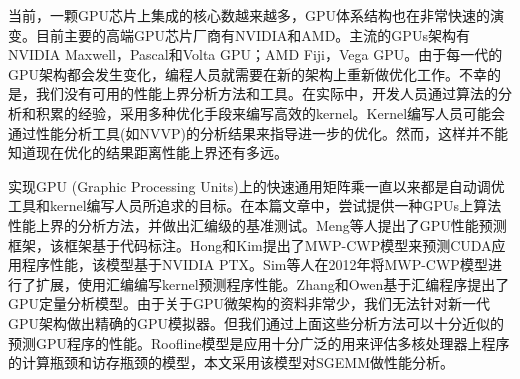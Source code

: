 %
%
当前，一颗GPU芯片上集成的核心数越来越多，GPU体系结构也在非常快速的演变。目前主要的高端GPU芯片厂商有NVIDIA和AMD。主流的GPUs架构有NVIDIA Maxwell，Pascal和Volta GPU；AMD Fiji，Vega GPU。由于每一代的GPU架构都会发生变化，编程人员就需要在新的架构上重新做优化工作。不幸的是，我们没有可用的性能上界分析方法和工具。在实际中，开发人员通过算法的分析和积累的经验，采用多种优化手段来编写高效的kernel。Kernel编写人员可能会通过性能分析工具(如NVVP)的分析结果来指导进一步的优化。然而，这样并不能知道现在优化的结果距离性能上界还有多远。

实现GPU (Graphic Processing Units)上的快速通用矩阵乘一直以来都是自动调优工具和kernel编写人员所追求的目标。在本篇文章中，尝试提供一种GPUs上算法性能上界的分析方法，并做出汇编级的基准测试。Meng等人提出了GPU性能预测框架，该框架基于代码标注。Hong和Kim提出了MWP-CWP模型来预测CUDA应用程序性能，该模型基于NVIDIA PTX。Sim等人在2012年将MWP-CWP模型进行了扩展，使用汇编编写kernel预测程序性能。Zhang和Owen基于汇编程序提出了GPU定量分析模型。由于关于GPU微架构的资料非常少，我们无法针对新一代GPU架构做出精确的GPU模拟器。但我们通过上面这些分析方法可以十分近似的预测GPU程序的性能。Roofline模型是应用十分广泛的用来评估多核处理器上程序的计算瓶颈和访存瓶颈的模型，本文采用该模型对SGEMM做性能分析。

